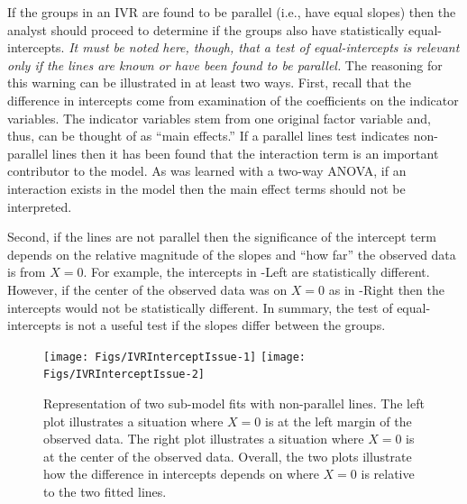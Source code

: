 \documentclass[10pt,openany]{book}\usepackage[]{graphicx}\usepackage[]{color}
\newenvironment{knitrout}{}{} %
\begin{document}
If the groups in an IVR are found to be parallel (i.e., have equal slopes) then the analyst should proceed to determine if the groups also have statistically equal-intercepts.  \emph{It must be noted here, though, that a test of equal-intercepts is relevant only if the lines are known or have been found to be parallel.}  The reasoning for this warning can be illustrated in at least two ways.  First, recall that the difference in intercepts come from examination of the coefficients on the indicator variables.  The indicator variables stem from one original factor variable and, thus, can be thought of as ``main effects.''  If a parallel lines test indicates non-parallel lines then it has been found that the interaction term is an important contributor to the model.  As was learned with a two-way ANOVA, if an interaction exists in the model then the main effect terms should not be interpreted.


\vspace{-12pt}

Second, if the lines are not parallel then the significance of the intercept term depends on the relative magnitude of the slopes and ``how far'' the observed data is from $X=0$.  For example, the intercepts in -Left are statistically different.  However, if the center of the observed data was on $X=0$ as in -Right then the intercepts would not be statistically different.  In summary, the test of equal-intercepts is not a useful test if the slopes differ between the groups.

\begin{knitrout}
\color{fgcolor}\begin{figure}[h]

{\centering \texttt{[image: Figs/IVRInterceptIssue-1]} 
\texttt{[image: Figs/IVRInterceptIssue-2]} 

}

\caption[Representation of two sub-model fits with non-parallel lines]{Representation of two sub-model fits with non-parallel lines.  The left plot illustrates a situation where $X=0$ is at the left margin of the observed data.  The right plot illustrates a situation where $X=0$ is at the center of the observed data.  Overall, the two plots illustrate how the difference in intercepts depends on where $X=0$ is relative to the two fitted lines.}\label{fig:IVRInterceptIssue}
\end{figure}


\end{knitrout}
\end{document}
